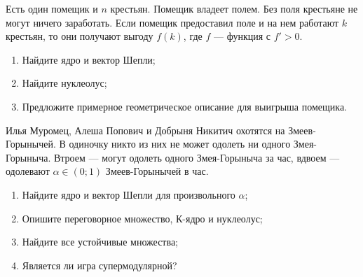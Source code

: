 \begin{problem}

Есть один помещик и $n$ крестьян. Помещик владеет полем. Без поля крестьяне не могут ничего заработать. Если помещик предоставил поле и на нем работают $k$ крестьян, то они получают выгоду $f(k)$, где $f$ --- функция с $f'>0$.
\begin{enumerate}
\item Найдите ядро и вектор Шепли;
\item Найдите нуклеолус;
\item Предложите примерное геометрическое описание для выигрыша помещика.
\end{enumerate}



\begin{sol}

\end{sol}
\end{problem}




\begin{problem}


Илья Муромец, Алеша Попович и Добрыня Никитич охотятся на Змеев-Горынычей. В одиночку никто из них не может одолеть ни одного Змея-Горыныча. Втроем --- могут одолеть одного Змея-Горыныча за час, вдвоем --- одолевают $\alpha\in (0;1)$ Змеев-Горынычей в час.
\begin{enumerate}
\item Найдите ядро и вектор Шепли для произвольного $\alpha$;
\item Опишите переговорное множество, К-ядро и нуклеолус;
\item Найдите все устойчивые множества;

\item Является ли игра супермодулярной?
\end{enumerate}



\begin{sol}

\end{sol}
\end{problem}




